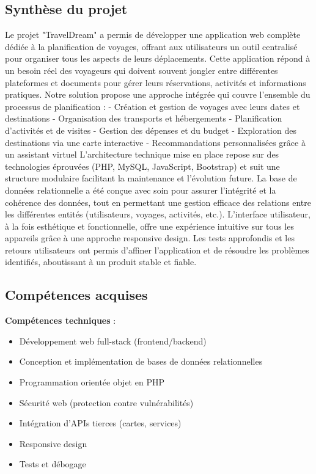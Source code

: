 \documentclass[a4paper,12pt]{article}
\begin{document}
\subsection{Synthèse du projet}
Le projet "TravelDream" a permis de développer une application web complète dédiée à
la planification de voyages, offrant aux utilisateurs un outil centralisé pour organiser
tous les aspects de leurs déplacements. Cette application répond à un besoin réel des
voyageurs qui doivent souvent jongler entre différentes plateformes et documents pour
gérer leurs réservations, activités et informations pratiques.
Notre solution propose une approche intégrée qui couvre l'ensemble du processus de
planification : - Création et gestion de voyages avec leurs dates et destinations -
Organisation des transports et hébergements - Planification d'activités et de visites -
Gestion des dépenses et du budget - Exploration des destinations via une carte
interactive - Recommandations personnalisées grâce à un assistant virtuel
L'architecture technique mise en place repose sur des technologies éprouvées (PHP,
MySQL, JavaScript, Bootstrap) et suit une structure modulaire facilitant la maintenance
et l'évolution future. La base de données relationnelle a été conçue avec soin pour
assurer l'intégrité et la cohérence des données, tout en permettant une gestion efficace
des relations entre les différentes entités (utilisateurs, voyages, activités, etc.).
L'interface utilisateur, à la fois esthétique et fonctionnelle, offre une expérience intuitive
sur tous les appareils grâce à une approche responsive design. Les tests approfondis et
les retours utilisateurs ont permis d'affiner l'application et de résoudre les problèmes
identifiés, aboutissant à un produit stable et fiable.

\subsection{Compétences acquises}
\textbf{Compétences techniques} :
\begin{itemize}
  \item Développement web full-stack (frontend/backend) 
  \item Conception et implémentation de bases de données relationnelles
  \item Programmation orientée objet en PHP
  \item Sécurité web (protection contre vulnérabilités)
  \item Intégration d’APIs tierces (cartes, services)
  \item Responsive design
  \item Tests et débogage
\end{itemize}
\end{document}
